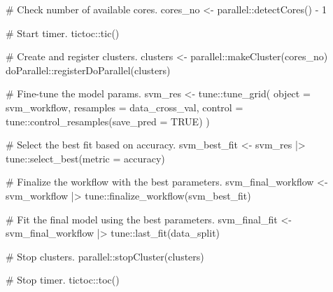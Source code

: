 \documentclass[
  letterpaper,
  DIV=11,
  numbers=noendperiod]{scrartcl}
\newenvironment{Shaded}{\begin{snugshade}}{\end{snugshade}}
\newcommand{\AttributeTok}[1]{\textcolor[rgb]{0.40,0.45,0.13}{#1}}
\newcommand{\CommentTok}[1]{\textcolor[rgb]{0.37,0.37,0.37}{#1}}
\newcommand{\ConstantTok}[1]{\textcolor[rgb]{0.56,0.35,0.01}{#1}}
\newcommand{\DecValTok}[1]{\textcolor[rgb]{0.68,0.00,0.00}{#1}}
\newcommand{\FunctionTok}[1]{\textcolor[rgb]{0.28,0.35,0.67}{#1}}
\newcommand{\NormalTok}[1]{\textcolor[rgb]{0.00,0.23,0.31}{#1}}
\newcommand{\OtherTok}[1]{\textcolor[rgb]{0.00,0.23,0.31}{#1}}
\newcommand{\SpecialCharTok}[1]{\textcolor[rgb]{0.37,0.37,0.37}{#1}}
\newcommand{\StringTok}[1]{\textcolor[rgb]{0.13,0.47,0.30}{#1}}
\begin{document}
\begin{Shaded}
\begin{Highlighting}[]
\CommentTok{\#\textquotesingle{} Check number of available cores.}
\NormalTok{cores\_no }\OtherTok{\textless{}{-}}\NormalTok{ parallel}\SpecialCharTok{::}\FunctionTok{detectCores}\NormalTok{() }\SpecialCharTok{{-}} \DecValTok{1}

\CommentTok{\#\textquotesingle{} Start timer.}
\NormalTok{tictoc}\SpecialCharTok{::}\FunctionTok{tic}\NormalTok{()}

\CommentTok{\# Create and register clusters.}
\NormalTok{clusters }\OtherTok{\textless{}{-}}\NormalTok{ parallel}\SpecialCharTok{::}\FunctionTok{makeCluster}\NormalTok{(cores\_no)}
\NormalTok{doParallel}\SpecialCharTok{::}\FunctionTok{registerDoParallel}\NormalTok{(clusters)}

\CommentTok{\# Fine{-}tune the model params.}
\NormalTok{svm\_res }\OtherTok{\textless{}{-}}\NormalTok{ tune}\SpecialCharTok{::}\FunctionTok{tune\_grid}\NormalTok{(}
  \AttributeTok{object =}\NormalTok{ svm\_workflow,}
  \AttributeTok{resamples =}\NormalTok{ data\_cross\_val,}
  \AttributeTok{control =}\NormalTok{ tune}\SpecialCharTok{::}\FunctionTok{control\_resamples}\NormalTok{(}\AttributeTok{save\_pred =} \ConstantTok{TRUE}\NormalTok{)}
\NormalTok{)}

\CommentTok{\# Select the best fit based on accuracy.}
\NormalTok{svm\_best\_fit }\OtherTok{\textless{}{-}} 
\NormalTok{  svm\_res }\SpecialCharTok{|\textgreater{}} 
\NormalTok{  tune}\SpecialCharTok{::}\FunctionTok{select\_best}\NormalTok{(}\AttributeTok{metric =} \StringTok{\textquotesingle{}accuracy\textquotesingle{}}\NormalTok{)}

\CommentTok{\# Finalize the workflow with the best parameters.}
\NormalTok{svm\_final\_workflow }\OtherTok{\textless{}{-}} 
\NormalTok{  svm\_workflow }\SpecialCharTok{|\textgreater{}}
\NormalTok{  tune}\SpecialCharTok{::}\FunctionTok{finalize\_workflow}\NormalTok{(svm\_best\_fit)}

\CommentTok{\# Fit the final model using the best parameters.}
\NormalTok{svm\_final\_fit }\OtherTok{\textless{}{-}} 
\NormalTok{  svm\_final\_workflow }\SpecialCharTok{|\textgreater{}} 
\NormalTok{  tune}\SpecialCharTok{::}\FunctionTok{last\_fit}\NormalTok{(data\_split)}

\CommentTok{\# Stop clusters.}
\NormalTok{parallel}\SpecialCharTok{::}\FunctionTok{stopCluster}\NormalTok{(clusters)}

\CommentTok{\# Stop timer.}
\NormalTok{tictoc}\SpecialCharTok{::}\FunctionTok{toc}\NormalTok{()}
\end{Highlighting}
\end{Shaded}
\end{document}
